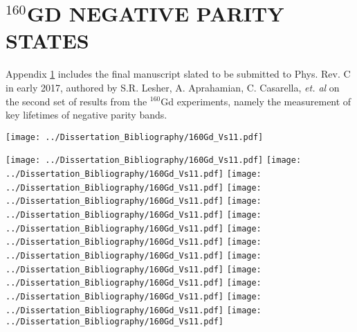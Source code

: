 \chapter{$^{160}$GD NEGATIVE PARITY STATES}\label{appendix:160Gd_neg}

Appendix \ref{appendix:160Gd_neg} includes the final manuscript slated to be submitted to Phys. Rev. C in early 2017, authored by S.R. Lesher, A. Aprahamian, C. Casarella, \textit{et. al} on the second set of results from the $^{160}$Gd experiments, namely the measurement of key lifetimes of negative parity bands.
\newpage

\texttt{[image: ../Dissertation\_Bibliography/160Gd\_Vs11.pdf]}

\newpage\texttt{[image: ../Dissertation\_Bibliography/160Gd\_Vs11.pdf]}
\newpage\texttt{[image: ../Dissertation\_Bibliography/160Gd\_Vs11.pdf]}
\newpage\texttt{[image: ../Dissertation\_Bibliography/160Gd\_Vs11.pdf]}
\newpage\texttt{[image: ../Dissertation\_Bibliography/160Gd\_Vs11.pdf]}
\newpage\texttt{[image: ../Dissertation\_Bibliography/160Gd\_Vs11.pdf]}
\newpage\texttt{[image: ../Dissertation\_Bibliography/160Gd\_Vs11.pdf]}
\newpage\texttt{[image: ../Dissertation\_Bibliography/160Gd\_Vs11.pdf]}
\newpage\texttt{[image: ../Dissertation\_Bibliography/160Gd\_Vs11.pdf]}
\newpage\texttt{[image: ../Dissertation\_Bibliography/160Gd\_Vs11.pdf]}
\newpage\texttt{[image: ../Dissertation\_Bibliography/160Gd\_Vs11.pdf]}
\newpage\texttt{[image: ../Dissertation\_Bibliography/160Gd\_Vs11.pdf]}
\newpage\texttt{[image: ../Dissertation\_Bibliography/160Gd\_Vs11.pdf]}
\newpage\texttt{[image: ../Dissertation\_Bibliography/160Gd\_Vs11.pdf]}
